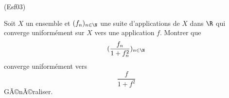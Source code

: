 \begin{tiny}(Esf03)\end{tiny} Soit $X$ un ensemble et $(f_n)_{n\in\N}$ une suite d'applications de $X$ dans $\R$ qui converge uniform{\'e}ment sur $X$ vers une application $f$. Montrer que
  \[(\frac{f_n}{1+f_n^2})_{n\in\N}\]
  converge uniform{\'e}ment vers
  \[\frac{f}{1+f^2}\]
GÃ©nÃ©raliser.